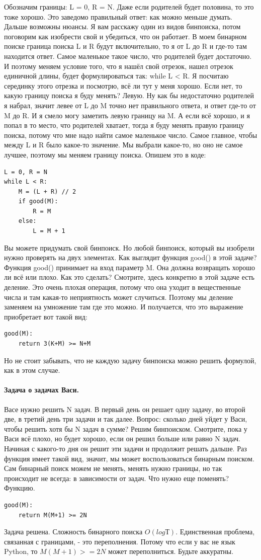 \documentclass[12pt]{article}
\begin{document}
Обозначим границы: L = 0, R = N. Даже если родителей будет половина, то это тоже хорошо. Это заведомо правильный ответ: как можно меньше думать. Дальше возможны нюансы. Я вам расскажу один из видов бинпоиска, потом поговорим как изобрести свой и убедиться, что он работает. В моем бинарном поиске граница поиска L и R будут включительно, то я от L до R и где-то там находится ответ. Самое маленькое такое число, что родителей будет достаточно. И поэтому меняем условие того, что я нашёл свой отрезок, нашел отрезок единичной длины, будет формулироваться так: while L < R. Я посчитаю серединку этого отрезка и посмотрю, всё ли тут у меня хорошо. Если нет, то какую границу поиска я буду менять? Левую. Ну как бы недостаточно родителей я набрал, значит левее от L до M точно нет правильного ответа, и ответ где-то от M до R. И я смело могу заметить левую границу на M. А если всё хорошо, и я попал в то место, что родителей хватает, тогда я буду менять правую границу поиска, потому что мне надо найти самое маленькое число. Самое главное, чтобы между L и R было какое-то значение. Мы выбрали какое-то, но оно не самое лучшее, поэтому мы меняем границу поиска. Опишем это в коде:
\begin{verbatim}
L = 0, R = N
while L < R:
    M = (L + R) // 2
    if good(M):
        R = M
    else:
        L = M + 1
\end{verbatim}
Вы можете придумать свой бинпоиск. Но любой бинпоиск, который вы изобрели нужно проверять на двух элементах. Как выглядит функция good() в этой задаче? Функция good() принимает на вход параметр M. 
Она должна возвращать хорошо ли всё или плохо. Как это сделать? Смотрите, здесь конкретно в этой задаче есть деление. Это очень плохая операция, потому что она уходит в вещественные числа и там какая-то неприятность может случиться. Поэтому мы деление заменяем на умножение там где это можно. И получается, что это выражение приобретает вот такой вид:
\begin{verbatim}
good(M):
    return 3(K+M) >= N+M
\end{verbatim}
Но не стоит забывать, что не каждую задачу бинпоиска можно решить формулой, как в этом случае. 
\paragraph{Задача о задачах Васи.}
Васе нужно решить N задач. В первый день он решает одну задачу, во второй две, в третий день три задачи и так далее. Вопрос: сколько дней уйдет у Васи, чтобы решить хотя бы N задач в сумме? Решим бинпоиском. Смотрите, пока у Васи всё плохо, но будет хорошо, если он решил больше или равно N задач. Начиная с какого-то дня он решит эти задачи и продолжит решать дальше. Раз функция имеет такой вид, значит, мы может воспользоваться бинарным поиском. Сам бинарный поиск можем не менять, менять нужно границы, но так происходит не всегда: в зависимости от задач. Что нужно еще поменять? Функцию. 
\begin{verbatim}
good(M):
    return M(M+1) >= 2N
\end{verbatim}
Задача решена. Сложность бинарного поиска $O(logТ)$. Единственная проблема, связанная с границами, - это переполнения. Потому что если у вас не язык Python, то $M(M+1) >= 2N$ может переполниться. Будьте аккуратны.
\end{document}
